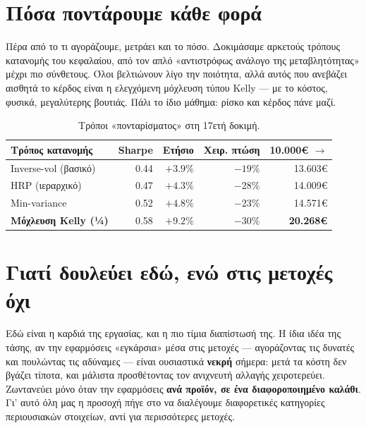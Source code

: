 \documentclass[11pt]{article}
\newcommand{\eur}{€}
\begin{document}
\section{Πόσα ποντάρουμε κάθε φορά}

Πέρα από το τι αγοράζουμε, μετράει και το πόσο. Δοκιμάσαμε αρκετούς τρόπους κατανομής του κεφαλαίου, από
τον απλό «αντιστρόφως ανάλογο της μεταβλητότητας» μέχρι πιο σύνθετους. Όλοι βελτιώνουν λίγο την ποιότητα,
αλλά αυτός που ανεβάζει αισθητά το κέρδος είναι η ελεγχόμενη μόχλευση τύπου Kelly --- με το κόστος,
φυσικά, μεγαλύτερης βουτιάς. Πάλι το ίδιο μάθημα: ρίσκο και κέρδος πάνε μαζί.

\begin{table}[ht]\centering\small
\begin{tabular}{lrrrr}\toprule
Τρόπος κατανομής & Sharpe & Ετήσιο & Χειρ. πτώση & 10.000\eur{} $\to$ \\\midrule
Inverse-vol (βασικό) & 0.44 & $+3.9\%$ & $-19\%$ & 13.603\eur{} \\
HRP (ιεραρχικό) & 0.47 & $+4.3\%$ & $-28\%$ & 14.009\eur{} \\
Min-variance & 0.52 & $+4.8\%$ & $-23\%$ & 14.571\eur{} \\
\textbf{Μόχλευση Kelly (¼)} & \textcolor{good}{0.58} & $+9.2\%$ & $-30\%$ & \textcolor{good}{\textbf{20.268\eur{}}} \\
\bottomrule\end{tabular}
\caption{Τρόποι «πονταρίσματος» στη 17ετή δοκιμή.}
\end{table}

\section{Γιατί δουλεύει εδώ, ενώ στις μετοχές όχι}

Εδώ είναι η καρδιά της εργασίας, και η πιο τίμια διαπίστωσή της. Η ίδια ιδέα της τάσης, αν την
εφαρμόσεις «εγκάρσια» μέσα στις μετοχές --- αγοράζοντας τις δυνατές και πουλώντας τις αδύναμες ---
είναι ουσιαστικά \textbf{νεκρή} σήμερα: μετά τα κόστη δεν βγάζει τίποτα, και μάλιστα προσθέτοντας τον
ανιχνευτή αλλαγής χειροτερεύει. Ζωντανεύει μόνο όταν την εφαρμόσεις \textbf{ανά προϊόν, σε ένα
διαφοροποιημένο καλάθι}. Γι' αυτό όλη μας η προσοχή πήγε στο να διαλέγουμε διαφορετικές κατηγορίες
περιουσιακών στοιχείων, αντί για περισσότερες μετοχές.
\end{document}
